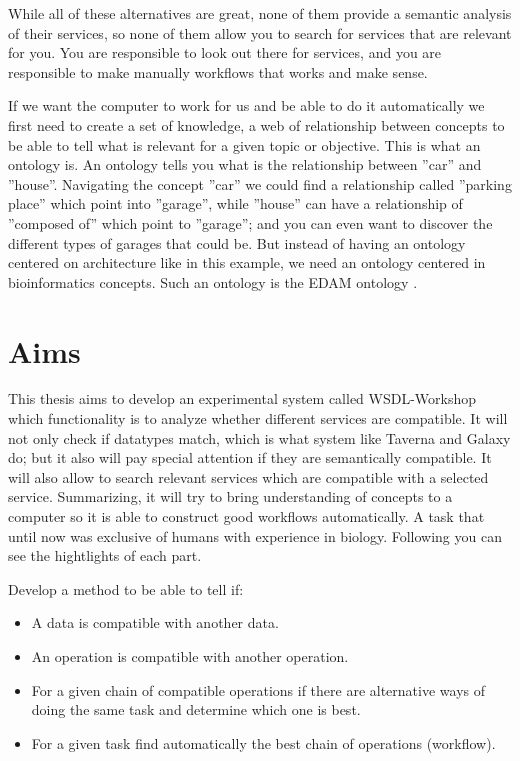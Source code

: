 \documentclass[a4paper,10pt]{article}
\begin{document}
While all of these alternatives are great, none of them provide a semantic analysis of their services, so none of them allow you to search for services that are relevant for you. You are responsible to look out there for services, and you are responsible to make manually workflows that works and make sense.\vspace{3 mm}

If we want the computer to work for us and be able to do it automatically we first need to create a set of knowledge, a web of relationship between concepts to be able to tell what is relevant for a given topic or objective. This is what an ontology is. An ontology tells you what is the relationship between ''car'' and ''house''. Navigating the concept ''car'' we could find a relationship called ''parking place'' which point into ''garage'', while ''house'' can have a relationship of ''composed of'' which point to ''garage''; and you can even want to discover the different types of garages that could be. But instead of having an ontology centered on architecture like in this example, we need an ontology centered in bioinformatics concepts. Such an ontology is the EDAM ontology \cite{journals/bioinformatics/IsonKJBUMMLPR13}.\vspace{3 mm}

\newpage

\section{Aims}
\label{chap:aims}

This thesis aims to develop an experimental system called WSDL-Workshop which functionality is to analyze whether different services are compatible. It will not only check if datatypes match, which is what system like Taverna and Galaxy do; but it also will pay special attention if they are semantically compatible. It will also allow to search relevant services which are compatible with a selected service. Summarizing, it will try to bring understanding of concepts to a computer so it is able to construct good workflows automatically. A task that until now was exclusive of humans with experience in biology. Following you can see the hightlights of each part.\vspace{3 mm}

Develop a method to be able to tell if:

\begin{itemize}
  \item A data is compatible with another data.
  \item An operation is compatible with another operation.
  \item For a given chain of compatible operations if there are alternative ways of doing the same task and determine which one is best.
  \item For a given task find automatically the best chain of operations (workflow).
\end{itemize}
\end{document}
